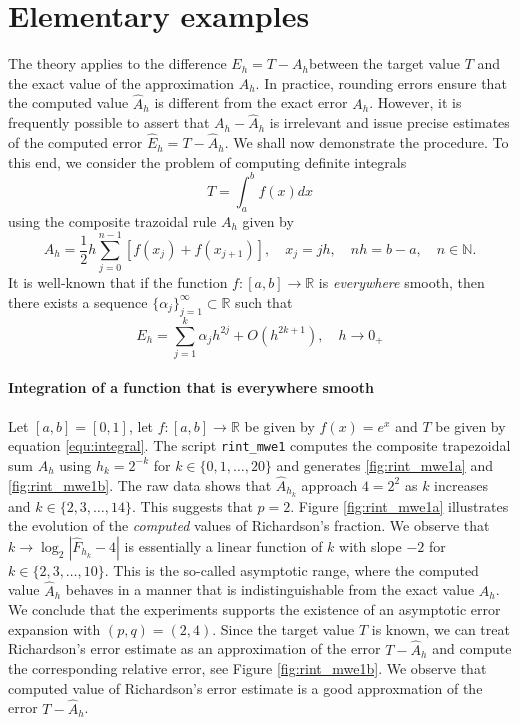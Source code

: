 \documentclass[runningheads]{llncs}
\begin{document}
\section{Elementary examples}

The theory applies to the difference $E_h = T - A_h$between the target value $T$ and the exact value of the approximation $A_h$.
In practice, rounding errors ensure that the computed value $\hat{A}_h$ is different from the exact error $A_h$. However, it is frequently possible to assert that $A_h - \hat{A}_h$ is irrelevant and issue precise estimates of the computed error $\hat{E}_h = T - \hat{A}_h$. We shall now demonstrate the procedure. To this end, we consider the problem of computing definite integrals
\begin{equation} \label{equ:integral}
  T = \int_{a}^b f(x) dx
\end{equation}
using the composite trazoidal rule $A_h$ given by
\begin{equation}
  A_h = \frac{1}{2}h \sum_{j=0}^{n-1} \left[ f(x_j) + f(x_{j+1}) \right], \quad x_j = jh, \quad nh = b-a, \quad n \in \mathbb{N}.
\end{equation}
It is well-known that if the function $f : [a,b] \rightarrow \mathbb{R} $ is \emph{everywhere} smooth, then there exists a sequence $\{\alpha_j\}_{j=1}^\infty \subset \mathbb{R}$ such that 
\begin{equation}
  E_h = \sum_{j=1}^k \alpha _j h^{2j} + O(h^{2k+1}), \quad h \rightarrow 0_+
\end{equation}

\paragraph{Integration of a function that is everywhere smooth}

Let $[a,b]= [0,1]$, let $f : [a, b] \rightarrow \mathbb{R}$ be given by $f(x) = e^x$ and $T$ be given by equation \eqref{equ:integral}.
The script {\tt rint\_mwe1} computes the composite trapezoidal sum $A_h$ using $h_k = 2^{-k}$ for $k \in \{0,1,\dots,20\}$ and generates \ref{fig:rint_mwe1a} and \ref{fig:rint_mwe1b}.
The raw data shows that $\hat{A}_{h_k}$ approach $4 = 2^2$ as $k$ increases and $k \in \{2,3,\dots,14\}$.
This suggests that $p=2$.
Figure \ref{fig:rint_mwe1a} illustrates the evolution of the \emph{computed} values of Richardson's fraction.
We observe that $k \rightarrow \log_2|\hat{F}_{h_k} - 4|$ is essentially a linear function of $k$ with slope $-2$ for $k \in \{2,3,\dots,10\}$.
This is the so-called asymptotic range, where the computed value $\hat{A}_h$  behaves in a manner that is indistinguishable from the exact value $A_h$.
We conclude that the experiments supports the existence of an asymptotic error expansion with $(p,q) = (2,4)$.
Since the target value $T$ is known, we can treat Richardson's error estimate as an approximation of the error $T - \hat{A}_h$ and compute the corresponding relative error, see Figure \ref{fig:rint_mwe1b}.
We observe that computed value of Richardson's error estimate is a good approxmation of the error $T - \hat{A}_h$.
\end{document}

